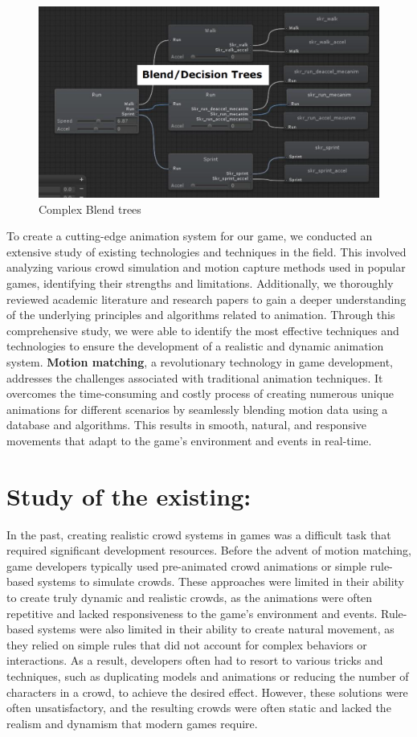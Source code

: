 \documentclass[12pt]{book}
\begin{document}
\begin{figure}[!h]
    \centering
    \includegraphics[scale=0.3]{./Figures/Images/blendtrees.png}
    \caption{Complex Blend trees}
    \label{Complex Blend trees}
\end{figure}
To create a cutting-edge animation system for our game, we conducted an extensive study of existing
technologies and techniques in the field. This involved analyzing various crowd simulation
and motion capture methods used in popular games, identifying their strengths and limitations.
Additionally, we thoroughly reviewed academic literature and research papers to gain a deeper
understanding of the underlying principles and algorithms related to animation. Through this
comprehensive study, we were able to identify the most effective techniques and technologies to
ensure the development of a realistic and dynamic animation system. \textbf{Motion matching},
a revolutionary technology in game development, addresses the challenges associated with
traditional animation techniques. It overcomes the time-consuming and costly process of creating
numerous unique animations for different scenarios by seamlessly blending motion data using a
database and algorithms. This results in smooth, natural, and responsive movements that adapt to
the game's environment and events in real-time.
\newpage
\section{Study of the existing:}
In the past, creating realistic crowd systems in games was a difficult task that required
significant development resources. Before the advent of motion matching, game developers
typically used pre-animated crowd animations or simple rule-based systems to simulate crowds.
These approaches were limited in their ability to create truly dynamic and realistic crowds, as
the animations were often repetitive and lacked responsiveness to the game's environment and
events. Rule-based systems were also limited in their ability to create natural movement, as they
relied on simple rules that did not account for complex behaviors or interactions. As a result,
developers often had to resort to various tricks and techniques, such as duplicating models and
animations or reducing the number of characters in a crowd, to achieve the desired effect.
However, these solutions were often unsatisfactory, and the resulting crowds were often static
and lacked the realism and dynamism that modern games require.
\end{document}
